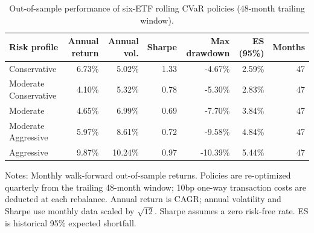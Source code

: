 \begin{table}[htbp]
\centering
\footnotesize
\caption{Out-of-sample performance of six-ETF rolling CVaR policies (48-month trailing window).}
\label{tab:gbi-rolling-policy-48m}
\begin{tabular}{lrrrrrr}
\toprule
Risk profile & Annual return & Annual vol. & Sharpe & Max drawdown & ES (95\%) & Months \\
\midrule
Conservative & 6.73\% & 5.02\% & 1.33 & -4.67\% & 2.59\% & 47 \\
Moderate Conservative & 4.10\% & 5.32\% & 0.78 & -5.30\% & 2.83\% & 47 \\
Moderate & 4.65\% & 6.99\% & 0.69 & -7.70\% & 3.84\% & 47 \\
Moderate Aggressive & 5.97\% & 8.61\% & 0.72 & -9.58\% & 4.84\% & 47 \\
Aggressive & 9.87\% & 10.24\% & 0.97 & -10.39\% & 5.44\% & 47 \\
\bottomrule
\end{tabular}
\vspace{2pt}
\begin{minipage}{0.96\linewidth}
\footnotesize
Notes: Monthly walk-forward out-of-sample returns. Policies are re-optimized quarterly from the trailing 48-month window; 10bp one-way transaction costs are deducted at each rebalance. Annual return is CAGR; annual volatility and Sharpe use monthly data scaled by $\sqrt{12}$. Sharpe assumes a zero risk-free rate. ES is historical 95\% expected shortfall.
\end{minipage}
\end{table}
